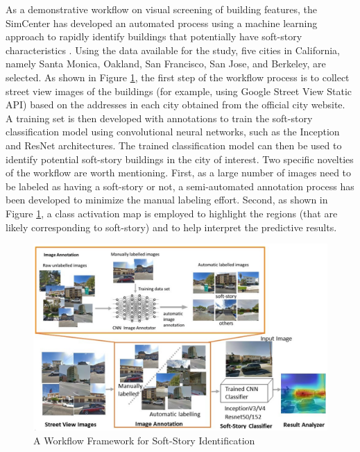 As a demonstrative workflow on visual screening of building features, the SimCenter has developed an automated process using a machine learning approach to rapidly identify buildings that potentially have soft-story characteristics \citep{yu2019building,yu2020largescale}. Using the data available for the study, five cities in California, namely Santa Monica, Oakland, San Francisco, San Jose, and Berkeley, are selected. As shown in Figure \ref{fig:soft_story_identification}, the first step of the workflow process is to collect street view images of the buildings (for example, using Google Street View Static API) based on the addresses in each city obtained from the official city website. A training set is then developed with annotations to train the soft-story classification model using convolutional neural networks, such as the Inception \citep{szegedy2016rethinking,szegedy2017inceptionv4} and ResNet \citep{he2016deep} architectures. The trained classification model can then be used to identify potential soft-story buildings in the city of interest. Two specific novelties of the workflow are worth mentioning. First, as a large number of images need to be labeled as having a soft-story or not, a semi-automated annotation process has been developed to minimize the manual labeling effort. Second, as shown in Figure \ref{fig:soft_story_identification}, a class activation map \citep{zhou2016learning} is employed to highlight the regions (that are likely corresponding to soft-story) and to help interpret the predictive results.

\begin{figure}[htb]
    \centering
    \includegraphics[width=1.0\textwidth, angle = 0]{Figures/soft_story_identification.png}
    \caption{A Workflow Framework for Soft-Story Identification}
    \label{fig:soft_story_identification}
\end{figure}

